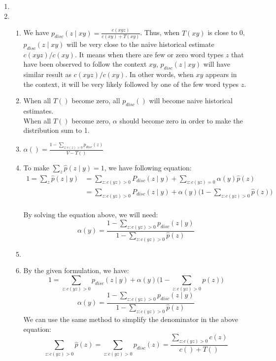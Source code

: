 \documentclass[10pt]{article}
\begin{document}
\begin{enumerate}
        \item %
        \item %
        \begin{enumerate}
            \item %
            We have $p_{disc}(z \mid xy) = \frac{c(xyz)}{c(xy) + T(xy)}$. Thus, when $T(xy)$ is close to 0, $p_{disc}(z \mid xy)$ will be very close to the naive historical estimate $c(xyz)/c(xy)$. It means when there are few or zero word types $z$ that have been observed to follow the context $xy$, $p_{disc}(z \mid xy)$ will have similar result as $c(xyz)/c(xy)$. In other words, when $xy$ appears in the context, it will be very likely followed by one of the few word types $z$.
            
            \item %
            When all $T()$ become zero, all $p_{disc}()$ will become naive historical estimates.\\
            When all $T()$ become zero, $\alpha$ should become zero in order to make the distribution sum to 1.
            
            
            \item
            $\alpha() = \frac{1 - \sum_{z:c(z)>0}p_{disc}(z)}{V - T()}$\\
            
            \item 
            To make $\sum_z\hat{p}(z \mid y) = 1$, we have following equation:
            \begin{align*}
              1 = \sum_z\hat{p}(z \mid y)
              &= \sum_{z: c(yz)>0}P_{disc}(z \mid y) + \sum_{z:c(yz)=0}\alpha(y)\hat{p}(z)
              \\&= \sum_{z: c(yz)>0}P_{disc}(z \mid y) + \alpha(y)\Big(1 - \sum_{z:c(yz)>0}\hat{p}(z) \Big)
            \end{align*}\\            
            By solving the equation above, we will need:
            $$\alpha(y) = \frac{1 - \sum_{z:c(yz)>0}p_{disc}(z \mid y)}{1 - \sum_{z:c(yz)>0}\hat{p}(z)}$$
            
            \item %
            \item %
            By the given formulation, we have:
            $$1 = \sum_{z:c(yz)>0}p_{disc}(z \mid y) + \alpha(y) \Big(1 - \sum_{z:c(yz)>0}p(z) \Big)$$
            $$\alpha(y) = \frac{1 - \sum_{z:c(yz)>0}p_{disc}(z \mid y)}{1 - \sum_{z:c(yz)>0}\hat{p}(z)}$$
            We can use the same method to simplify the denominator in the above equation:
            $$\sum_{z:c(yz)>0}\hat{p}(z) = \sum_{z:c(yz)>0}p_{disc}(z) = \frac{\sum_{z:c(yz)>0}c(z)}{c() + T()}$$
            

\end{enumerate}
\end{enumerate}
\end{document}
